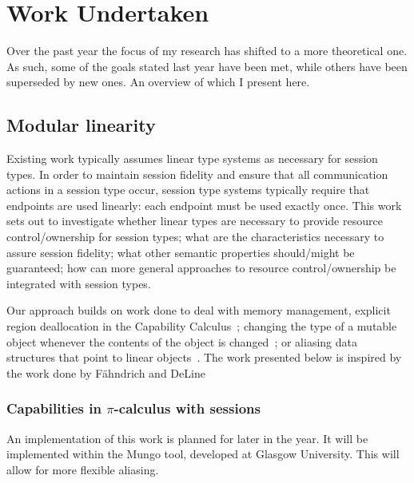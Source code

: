 \section{Work Undertaken}
\label{Research}
%

Over the past year the focus of my research has shifted to a more theoretical one. As such, some of the goals stated last year have been met, while others have been superseded by new ones. An overview of which I present here.

\subsection{Modular linearity}
\label{sub:modlinearity}
Existing work typically assumes linear type systems as necessary for session types. In order to maintain session fidelity and ensure that all communication actions in a session type occur, session type systems typically require that endpoints are used linearly: each endpoint must be used exactly once.
This work sets out to investigate whether linear types are necessary to provide resource control/ownership for session types; what are the characteristics necessary to assure session fidelity; what other semantic properties should/might be guaranteed; how can more general approaches to resource control/ownership be integrated with session types.

Our approach builds on work done to deal with memory management, explicit region deallocation in the Capability Calculus~\cite{Crary:1999:TMM:292540.292564}; changing the type of a mutable object whenever the contents of the object is changed~\cite{Ahmed:2007:LLL:1365997.1366003}; or aliasing data structures that point to linear objects~\cite{FahndrichM:adofpl1}. The work presented below is inspired by the work done by Fähndrich and DeLine~\cite{FahndrichM:adofpl1}


\subsubsection{Capabilities in $\pi$-calculus with sessions}



An implementation of this work is planned for later in the year. It will be implemented within the Mungo tool\cite{kouzapas16}, developed at Glasgow University. This will allow for more flexible aliasing.

